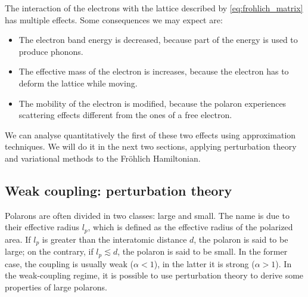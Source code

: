 The interaction of the electrons with the lattice described by \cref{eq:frohlich_matrix} has multiple effects. Some consequences we may expect are:
\begin{itemize}
    \item The electron band energy is decreased, because part of the energy is used to produce phonons.
    \item The effective mass of the electron is increases, because the electron has to deform the lattice while moving.
    \item The mobility of the electron is modified, because the polaron experiences scattering effects different from the ones of a free electron.
\end{itemize}
We can analyse quantitatively the first of these two effects using approximation techniques. We will do it in the next two sections, applying perturbation theory and variational methods to the Fr\"{o}hlich Hamiltonian.

\subsection{Weak coupling: perturbation theory}
Polarons are often divided in two classes: large and small. The name is due to their effective radius $l_p$, which is defined as the effective radius of the polarized area. If $l_p$ is greater than the interatomic distance $d$, the polaron is said to be large; on the contrary, if $l_p \lesssim d$, the polaron is said to be small. In the former case, the coupling is usually weak ($\alpha < 1$), in the latter it is strong ($\alpha > 1$). In the weak-coupling regime, it is possible to use perturbation theory to derive some properties of large polarons.

